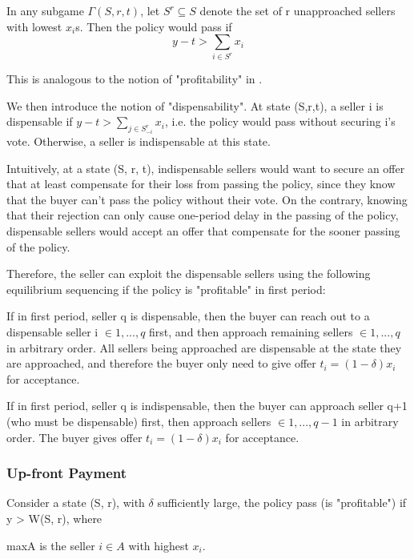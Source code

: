 \documentclass[ProjectGAZ]{subfiles}
\begin{document}
In any subgame  $\Gamma(S,r,t)$, let $S^r \subseteq S$ denote the set of r unapproached sellers with lowest $x_i$s. Then the policy would pass if 
\begin{equation}
	y - t > \sum_{i \in S^r} x_i
\end{equation}

This is analogous to the notion of "profitability" in \cite{Xiao}.

We then introduce the notion of "dispensability". At state (S,r,t), a seller i is dispensable if $y-t > \sum_{j \in S_{-i}^r} x_i$, i.e. the policy would pass without securing i's vote. Otherwise, a seller is indispensable at this state.

Intuitively, at a state (S, r, t), indispensable sellers would want to secure an offer that at least compensate for their loss from passing the policy, since they know that the buyer can't pass the policy without their vote. On the contrary, knowing that their rejection can only cause one-period delay in the passing of the policy, dispensable sellers would accept an offer that compensate for the sooner passing of the policy.

Therefore, the seller can exploit the dispensable sellers using the following equilibrium sequencing if the policy is "profitable" in first period:

If in first period, seller q is dispensable, then the buyer can reach out to a dispensable seller i $\in{1, ..., q}$ first, and then approach remaining sellers $\in{1, ..., q}$ in arbitrary order. All sellers being approached are dispensable at the state they are approached, and therefore the buyer only need to give offer $t_i = (1-\delta)x_i$ for acceptance.

If in first period, seller q is indispensable, then the buyer can approach seller q+1 (who must be dispensable) first, then approach sellers $\in {1, ..., q-1}$ in arbitrary order. The buyer gives offer $t_i = (1-\delta)x_i$ for acceptance.

\subsubsection{Up-front Payment}

Consider a state (S, r), with $\delta$ sufficiently large, the policy pass (is "profitable") if y > W(S, r), where



maxA is the seller $i\in A$ with highest $x_i$.
\end{document}
